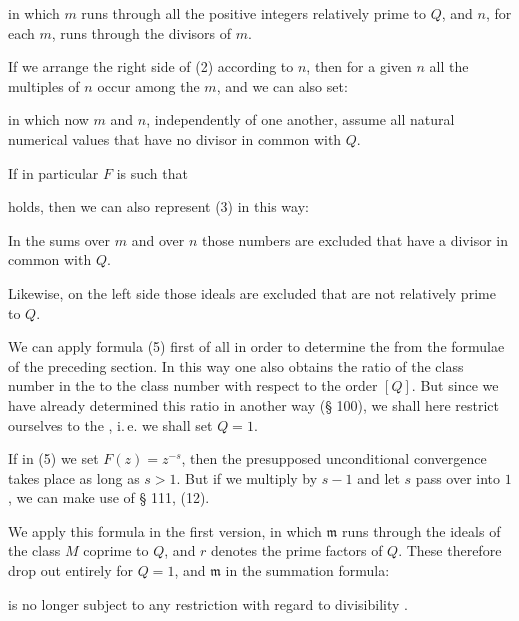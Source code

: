 in which $m$ runs through all the positive integers relatively prime to $Q$,
and $n$, for each $m$, runs through the divisors of $m$.

If we arrange the right side of (2) according to $n$, then for a
given $n$ all the multiples of $n$ occur among the $m$, and we
can also set:


in which now $m$ and $n$, independently of one another, assume all
natural numerical values that have no divisor in common with $Q$.

If in particular $F$ is such that


holds, then we can also represent (3) in this way:


In the sums over $m$ and over $n$ those numbers are excluded
that have a divisor in common with $Q$.

Likewise, on the left side those ideals are excluded
that are not relatively prime to $Q$.

We can apply formula (5) first of all in order to determine the
 from the formulae of the preceding section.
In this way one also obtains the ratio of the class number
in the  to the class number with respect to the order $[Q]$. But since
we have already determined this ratio in another way
(§ 100), we shall here restrict ourselves to the , i.\,e. we shall set $Q = 1$.

If in (5) we set $F(z) = z^{-s}$, then the presupposed
unconditional convergence takes place as long as $s > 1$. But if we
multiply by $s - 1$ and let $s$ pass over into $1$, we can
make use of § 111, (12).

We apply this formula in the first version, in
which $\mathfrak{m}$ runs through the ideals of the class $M$ coprime to $Q$,
and $r$ denotes the prime factors of $Q$. These therefore drop out
entirely for $Q = 1$, and $\mathfrak{m}$ in the summation formula:


is no longer subject to any restriction with regard to divisibility
.
